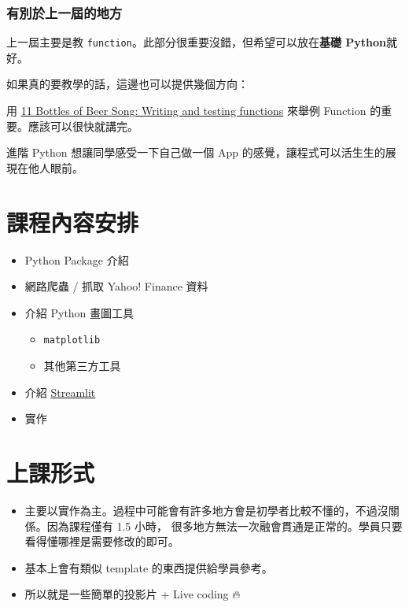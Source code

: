 \documentclass{beamer}
\newcommand{\code}[1]{\texttt{\textcolor{pinky}{#1}}}
\begin{document}
\begin{frame}
  \frametitle{有別於上一屆的地方}
  上一屆主要是教 \code{function}。此部分很重要沒錯，但希望可以放在\textbf{基礎 Python}就好。

  \vspace{5mm} %
  
  如果真的要教學的話，這邊也可以提供幾個方向：
  \begin{examples}
    用 \href{https://livebook.manning.com/book/tiny-python-projects/chapter-11/}{11 Bottles of Beer Song: Writing and testing functions} 來舉例 Function 的重要。應該可以很快就講完。
  \end{examples}

  進階 Python 想讓同學感受一下自己做一個 App 的感覺，讓程式可以活生生的展現在他人眼前。
\end{frame}

\section{課程內容安排}
\begin{frame}
\begin{itemize}
  \item Python Package 介紹
  \item 網路爬蟲 / 抓取 Yahoo! Finance 資料
  \item 介紹 Python 畫圖工具           
  \begin{itemize}
    \item \code{matplotlib}
    \item 其他第三方工具
  \end{itemize}
  \item 介紹 \href{https://streamlit.io}{Streamlit}                     
  \item 實作                               
\end{itemize}
\end{frame}

\section{上課形式}
\begin{frame}
\begin{itemize}
  \item 主要以實作為主。過程中可能會有許多地方會是初學者比較不懂的，不過沒關係。因為課程僅有 1.5 小時，
  很多地方無法一次融會貫通是正常的。學員只要看得懂哪裡是需要修改的即可。
  \item 基本上會有類似 template 的東西提供給學員參考。
  \item 所以就是一些簡單的投影片 + Live coding 🔥
\end{itemize}
\end{frame}
\end{document}
